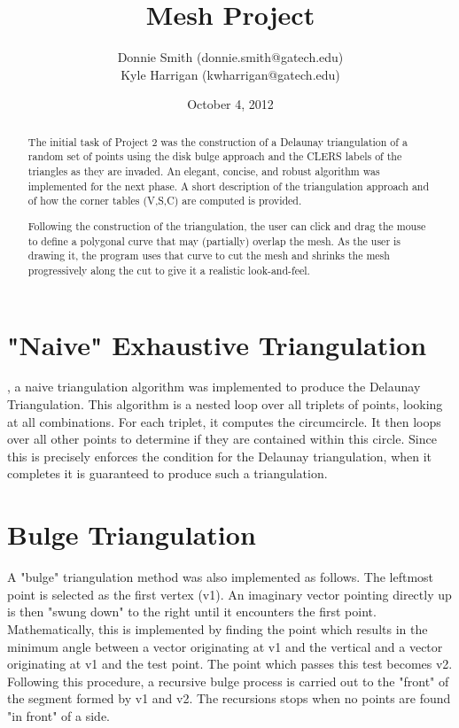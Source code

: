 \documentclass[letterpaper,10pt]{IEEEtran}
\title{Mesh Project}
\author{
Donnie Smith (donnie.smith@gatech.edu) \\
Kyle Harrigan (kwharrigan@gatech.edu) 
}
\date{October 4, 2012}                                           %
\begin{document}


\maketitle

 \begin{abstract}
 
The initial task of Project 2 was the construction of a Delaunay triangulation \cite{wiki:delaunay} of a random set of points using the disk bulge approach and the CLERS \cite{Rossignac99wrapzip} labels of the triangles as they are invaded.  An elegant, concise, and robust algorithm was implemented for the next phase. A short description of the triangulation approach and of how the corner tables (V,S,C) \cite{Rossignac04compressingvolumes} are computed is provided.

Following the construction of the triangulation, the user can click and drag the mouse to define a polygonal curve that may (partially) overlap the mesh.  As the user is drawing it, the program uses that curve to cut the mesh and shrinks the mesh progressively along the cut to give it a realistic look-and-feel.
 
 \end{abstract}
 
\section{"Naive" Exhaustive Triangulation}
 , a naive triangulation algorithm was implemented to produce the Delaunay Triangulation.  This algorithm is a nested loop over all triplets of points, looking at all combinations.  For each triplet, it computes the circumcircle.  It then loops over all other points to determine if they are contained within this circle.  Since this is precisely enforces the condition for the Delaunay triangulation, when it completes it is guaranteed to produce such a triangulation.  

\section{Bulge Triangulation}
A "bulge" triangulation method was also implemented as follows.  The leftmost point is selected as the first vertex (v1).  An imaginary vector pointing directly up is then "swung down" to the right until it encounters the first point.  Mathematically, this is implemented by finding the point which results in the minimum angle between a vector originating at v1 and the vertical and a vector originating at v1 and the test point.  The point which passes this test becomes v2.  
Following this procedure, a recursive bulge process is carried out to the "front" of the segment formed by v1 and v2.    The recursions stops when no points are found "in front" of a side.   
\end{document}
